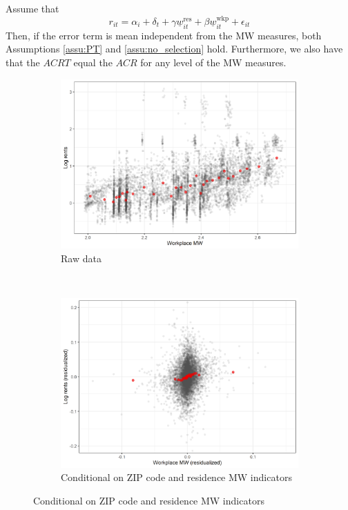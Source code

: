 \documentclass{article}
\newcommand{\mw}{\underline{w}}
\newcommand{\wkp}{\text{wkp}}
\newcommand{\res}{\text{res}}
\begin{document}
Assume that
$$
r_{it} = \alpha_i + \delta_t + \gamma \mw_{it}^{\res} + \beta \mw_{it}^{\wkp} + \epsilon_{it}
$$
Then, if the error term is mean independent from the MW measures, both 
Assumptions \ref{assu:PT} and \ref{assu:no_selection} hold.
Furthermore, we also have that the $ACRT$ equal the $ACR$ for any level of 
the MW measures.

\printbibliography

\clearpage
\begin{figure}[h!]
    \centering
    \caption{The relationship between log rents and the workplace MW}
    \label{fig:ln_rents_mw_wkp}

    \begin{subfigure}{.7\textwidth}
        \caption{Raw data}
        \includegraphics[width = 1\textwidth]
            {plots/cbsa_month_mw_wkp.png}
    \end{subfigure}\\
    \begin{subfigure}{.7\textwidth}
        \caption{Conditional on ZIP code and residence MW indicators}
        \includegraphics[width = 1\textwidth]
            {plots/cbsa_month_mw_wkp_resid_mw_res_dec.png}
    \end{subfigure}


\end{figure}
\end{document}
